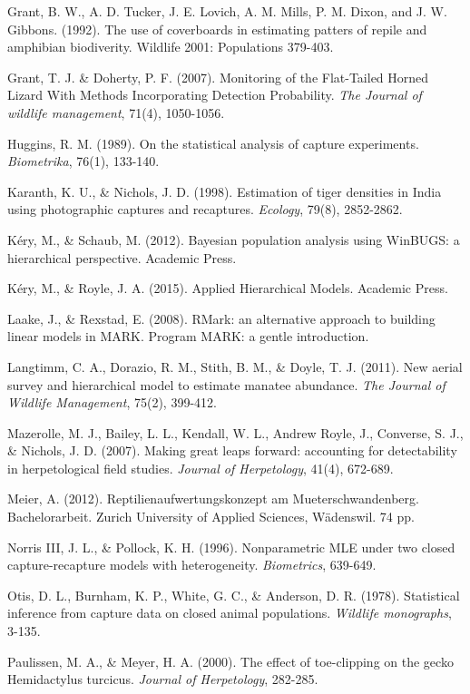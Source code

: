 \documentclass{book}
\begin{document}
\rf Grant, B. W., A. D. Tucker, J. E. Lovich, A. M. Mills, P. M. Dixon, and J. W. Gibbons. (1992). The use of coverboards in estimating patters of repile and amphibian biodiverity. Wildlife 2001: Populations 379-403.

\rf Grant, T. J. \& Doherty, P. F. (2007). Monitoring of the Flat-Tailed Horned Lizard With Methods Incorporating Detection Probability. \textit{The Journal of wildlife management}, 71(4), 1050-1056.

\rf Huggins, R. M. (1989). On the statistical analysis of capture experiments. \textit{Biometrika}, 76(1), 133-140.

\rf  Karanth, K. U., \& Nichols, J. D. (1998). Estimation of tiger densities in India using photographic captures and recaptures. \textit{Ecology}, 79(8), 2852-2862.

\rf K\'{e}ry, M., \& Schaub, M. (2012). Bayesian population analysis using WinBUGS: a hierarchical perspective. Academic Press.

\rf K\'{e}ry, M., \& Royle, J. A. (2015). Applied Hierarchical Models. Academic Press.

\rf Laake, J., \& Rexstad, E. (2008). RMark: an alternative approach to building linear models in MARK. Program MARK: a gentle introduction.

\rf Langtimm, C. A., Dorazio, R. M., Stith, B. M., \& Doyle, T. J. (2011). New aerial survey and hierarchical model to estimate manatee abundance. \textit{The Journal of Wildlife Management}, 75(2), 399-412.

\rf Mazerolle, M. J., Bailey, L. L., Kendall, W. L., Andrew Royle, J., Converse, S. J., \& Nichols, J. D. (2007). Making great leaps forward: accounting for detectability in herpetological field studies. \textit{Journal of Herpetology}, 41(4), 672-689.

\rf Meier, A. (2012). Reptilienaufwertungskonzept am Mueterschwandenberg. Bachelorarbeit. Zurich University of Applied Sciences, Wädenswil. 74 pp.

\rf Norris III, J. L., \& Pollock, K. H. (1996). Nonparametric MLE under two closed capture-recapture models with heterogeneity. \textit{Biometrics}, 639-649.

\rf Otis, D. L., Burnham, K. P., White, G. C., \& Anderson, D. R. (1978). Statistical inference from capture data on closed animal populations. \textit{Wildlife monographs}, 3-135.

\rf Paulissen, M. A., \& Meyer, H. A. (2000). The effect of toe-clipping on the gecko Hemidactylus turcicus. \textit{Journal of Herpetology}, 282-285.
\end{document}
